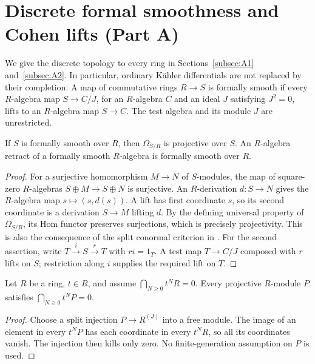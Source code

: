 \section{Discrete formal smoothness and Cohen lifts (Part A)}\label{sec:A}

We give the discrete topology to every ring in Sections~\ref{subsec:A1}
and~\ref{subsec:A2}.  In particular, ordinary K\"ahler differentials are
not replaced by their completion.  A map of commutative rings $R\to S$ is
formally smooth if every $R$-algebra map $S\to C/J$, for an $R$-algebra
$C$ and an ideal $J$ satisfying $J^2=0$, lifts to an $R$-algebra map
$S\to C$.  The test algebra and its module $J$ are unrestricted.

\begin{lemma}\label{SA23-A-01}
If $S$ is formally smooth over $R$, then $\Omega_{S/R}$ is projective
over $S$.  An $R$-algebra retract of a formally smooth $R$-algebra is
formally smooth over $R$.
\end{lemma}
\begin{proof}
For a surjective homomorphism $M\to N$ of $S$-modules, the map of
square-zero $R$-algebras $S\oplus M\to S\oplus N$ is surjective.
An $R$-derivation $d:S\to N$ gives the $R$-algebra map
$s\mapsto(s,d(s))$.  A lift has first coordinate $s$, so its second
coordinate is a derivation $S\to M$ lifting $d$.  By the defining
universal property of $\Omega_{S/R}$, its Hom functor preserves
surjections, which is precisely projectivity.  This is also the
consequence of the split conormal criterion in
\cite[Tag 00TH, Lemma 10.138.7]{rootStacksSmooth}.
For the second assertion, write $T\xrightarrow{i}S\xrightarrow{r}T$
with $ri=1_T$.  A test map $T\to C/J$ composed with $r$ lifts on $S$;
restriction along $i$ supplies the required lift on $T$.
\end{proof}

\begin{lemma}\label{SA23-A-02}
Let $R$ be a ring, $t\in R$, and assume $\bigcap_{N\geq0}t^NR=0$.
Every projective $R$-module $P$ satisfies
$\bigcap_{N\geq0}t^NP=0$.
\end{lemma}
\begin{proof}
Choose a split injection $P\to R^{(J)}$ into a free module.  The image
of an element in every $t^NP$ has each coordinate in every $t^NR$,
so all its coordinates vanish.  The injection then kills only zero.
No finite-generation assumption on $P$ is used.
\end{proof}

